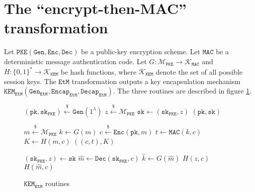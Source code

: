 \documentclass[floatrow,journal=tches,submission]{iacrtrans}
\newcommand{\monospace}{\texttt}
\newcommand{\pke}{\monospace{PKE}}
\newcommand{\keygen}{\monospace{Gen}}
\newcommand{\encrypt}{\monospace{Enc}}
\newcommand{\decrypt}{\monospace{Dec}}
\newcommand{\kem}{\monospace{KEM}}
\newcommand{\encap}{\monospace{Encap}}
\newcommand{\decap}{\monospace{Decap}}
\newcommand{\etm}{\monospace{EtM}}  %
\newcommand{\mac}{\monospace{MAC}}
\newcommand{\pk}{\monospace{pk}}
\newcommand{\sk}{\monospace{sk}}
\newcommand{\leftsample}{\stackrel{\$}{\leftarrow}}
\begin{document}
\section{The ``encrypt-then-MAC'' transformation}\label{sec:main-results}
Let $\pke(\keygen, \encrypt, \decrypt)$ be a public-key encryption scheme. Let $\mac$ be a deterministic message authentication code. Let $G: \mathcal{M}_\pke \rightarrow \mathcal{K}_\mac$ and $H: \{0,1\}^\ast \rightarrow \mathcal{K}_\kem$ be hash functions, where $\mathcal{K}_\kem$ denote the set of all possible session keys. The $\etm$ transformation outputs a key encapsulation mechanism $\kem_\etm(\keygen_\etm, \encap_\etm, \decap_\etm)$. The three routines are described in figure \ref{fig:etm-routines}.

\begin{figure}[H]
    \center
    \begin{minipage}{0.29\textwidth}
        \begin{algorithm}[H]
            \caption{$\keygen_\etm$}\label{alg:etm-keygen}
            \begin{algorithmic}[1]
                \State $(\pk, \sk_\pke) \leftsample \keygen(1^\lambda)$
                \State $z \leftsample \mathcal{M}_\pke$
                \State $\sk \leftarrow (\sk_\pke, z)$
                \State \Return $(\pk, \sk)$
            \end{algorithmic}
        \end{algorithm}
    \end{minipage}
    \hfill
    \begin{minipage}{0.32\textwidth}
        \begin{algorithm}[H]
            \caption{$\encap_\etm(\pk)$}\label{alg:etm-encap}
            \begin{algorithmic}[1]
                \State $m \leftsample \mathcal{M}_\pke$
                \State $k \leftarrow G(m)$
                \State $c \leftsample \encrypt(\pk, m)$
                \State $t \leftarrow \mac(k, c)$
                \State $K \leftarrow H(m, c)$
                \State \Return $((c, t), K)$
            \end{algorithmic}
        \end{algorithm}
    \end{minipage}
    \hfill
    \begin{minipage}{0.37\textwidth}
        \begin{algorithm}[H]
            \caption{$\decap_\etm(\sk, (c, t))$}\label{alg:etm-decap}
            \begin{algorithmic}[1]
                \State $(\sk_\pke, z) \leftarrow \sk$
                \State $\hat{m} \leftarrow \decrypt(\sk_\pke, c)$
                \State $\hat{k} \leftarrow G(\hat{m})$
                \If{$\mac(\hat{k}, c) \neq t$}
                    \State \Return $H(z, c)$
                \EndIf
                \State \Return $H(\hat{m}, c)$
            \end{algorithmic}
        \end{algorithm}
    \end{minipage}
    \caption{$\kem_\etm$ routines}\label{fig:etm-routines} 
\end{figure}
\end{document}
